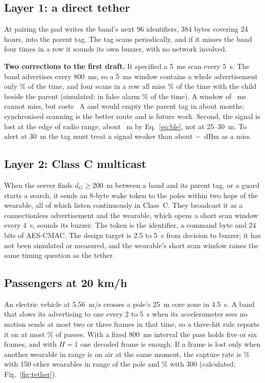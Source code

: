 \documentclass[11pt,a4paper]{article}
\begin{document}
\subsection{Layer 1: a direct tether}
At pairing the pad writes the band's next 96 identifiers, 384 bytes covering 24 hours, into the parent tag. The tag
scans periodically, and if it misses the band four times in a row it sounds its own buzzer, with no network involved.

\begin{finding}
\textbf{Two corrections to the first draft.} It specified a 5~ms scan every 5~s. The band advertises every 800~ms, so a
5~ms window contains a whole advertisement only \TetherHit\% of the time, and four scans in a row all miss
\TetherAlarm\% of the time with the child beside the parent (simulated: in false alarm \TetherAlarmSim\% of the time).
A window of \TetherWindow~ms cannot miss, but costs \TetherUa~\textmu A and would empty the parent tag in about
\ParentLife{} months; synchronised scanning is the better route and is future work. Second, the signal is lost at the
edge of radio range, about \TetherRange~m by Eq.~\ref{eq:ble}, not at 25--30~m. To alert at 30~m the tag must treat a
signal weaker than about $-$\TetherGate~dBm as a miss.
\end{finding}

\subsection{Layer 2: Class C multicast}
When the server finds $d_G\geq200$~m between a band and its parent tag, or a guard starts a search, it sends an 8-byte
wake token to the poles within two hops of the wearable, all of which listen continuously in Class~C. They broadcast
it as a connectionless advertisement and the wearable, which opens a short scan window every 4~s, sounds its buzzer.
The token is the identifier, a command byte and 24 bits of AES-CMAC. The design target is 2.5 to 5~s from decision to
buzzer; it has not been simulated or measured, and the wearable's short scan window raises the same timing question as
the tether.

\subsection{Passengers at 20 km/h}
An electric vehicle at 5.56~m/s crosses a pole's 25~m core zone in 4.5~s. A band that slows its advertising to one
every 2 to 5~s when its accelerometer sees no motion sends at most two or three frames in that time, so a three-hit
rule reports it on at most \SlowTwo\% of passes. With a fixed 800~ms interval the pass holds five or six frames, and
with $H=1$ one decoded frame is enough. If a frame is lost only when another wearable in range is on air at the same
moment, the capture rate is \EvCap\% with 150 other wearables in range of the pole and \EvCapDense\% with 300
(calculated; Fig.~\ref{fig:tether}).
\end{document}
